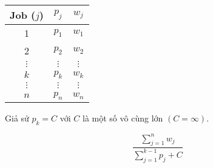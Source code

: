 \documentclass[tikz]{standalone}
\begin{document}
\begin{table}
    \begin{tabular}{| c | c | c |} 
    \hline
    Job ($j$) & $p_j$ & $w_j$ \\
    \hline
    1 & $p_1$ & $w_1$ \\
    2 & $p_2$ & $w_2$ \\
    $\vdots$ & $\vdots$ & $\vdots$ \\
    $k$ & $p_k$ & $w_k$ \\
    $\vdots$ & $\vdots$ & $\vdots$ \\
    $n$ & $p_n$ & $w_n$ \\
    \hline
    \end{tabular}
\end{table}
Giả sử $p_k = C$ với $C$ là một số vô cùng lớn $(C= \infty)$.

\begin{equation}
\frac{\sum_{j=1}^{n}w_j}{\sum_{j=1}^{k-1}p_j + C}
\end{equation}
\end{document}
